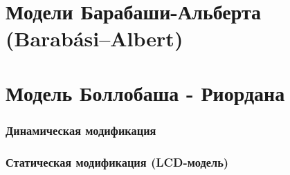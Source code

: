 \documentclass[t]{beamer}
\begin{document}
    \section{Модели Барабаши-Альберта (Barabási–Albert)} 
        \subsection{}

        \begin{frame}
            
        \end{frame}	

        \begin{frame}
            
        \end{frame}	

        \begin{frame}
            
        \end{frame}	
        
        \begin{frame}
            
        \end{frame}	

        \begin{frame}
            
        \end{frame}	

    \section{Модель Боллобаша - Риордана}
        \subsubsection{}

        \begin{frame}
            
        \end{frame}	
    
        \subsubsection{Динамическая модификация}

        \begin{frame}
            
        \end{frame}	
                
        \subsubsection{Статическая модификация (LCD-модель)}
\end{document}
